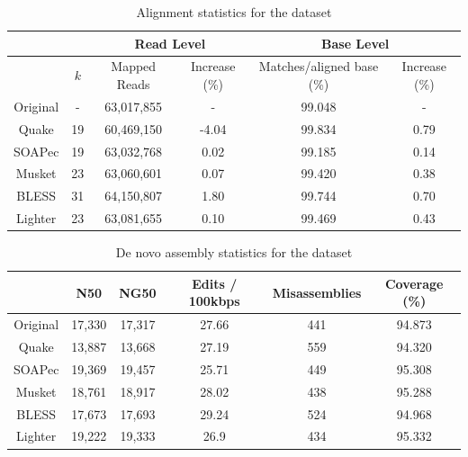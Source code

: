 \documentclass{bmcart}
\begin{document}
\begin{backmatter}
\begin{table}[h!]%
\caption{Alignment statistics for the \elegans dataset}
\begin{tabular}{|c|c|c|c||c|c|}\hline
  & & \multicolumn{2}{|c||}{Read Level} & \multicolumn{2}{|c|}{Base Level} \\ \hline
  &	$k$ & Mapped Reads  &Increase (\%) & Matches/aligned base (\%) & Increase (\%) \\ \hline
Original & - & 63,017,855	& - 	&	99.048 & - \\ \hline
Quake 	& 19 & 60,469,150	& -4.04	&	99.834 & 0.79 \\ \hline
SOAPec  & 19 & 63,032,768    & 0.02	& 	99.185 & 0.14 \\ \hline
Musket 	& 23 &	63,060,601	&	0.07 &	99.420 & 0.38 \\ \hline
BLESS 	& 31 & 64,150,807	& 1.80 &  99.744   & 0.70 \\ \hline
Lighter	& 23 & 63,081,655	& 0.10	& 99.469   & 0.43 \\ \hline
\end{tabular}
\end{table}

\begin{table}[h!] %
\caption{De novo assembly statistics for the \elegans dataset}
\begin{tabular}{|c|c|c|c|c|c|} \hline
	   & N50 &	NG50	& Edits / 100kbps &	Misassemblies	& Coverage (\%) \\ \hline
Original &	17,330	& 17,317	& 27.66	& 441& 	94.873 \\ \hline
Quake	&	13,887	& 13,668	& 27.19	& 559	& 94.320 \\ \hline
SOAPec  & 19,369	& 19,457	& 25.71	& 449	& 95.308 \\ \hline
Musket	&	18,761	& 18,917	& 28.02	& 438	& 95.288 \\ \hline
BLESS	&	17,673	& 17,693	& 29.24	& 524	& 94.968 \\ \hline
Lighter	&	19,222	& 19,333	& 26.9	& 434	& 95.332 \\ \hline
\end{tabular}
\end{table}


\end{backmatter}
\end{document}
